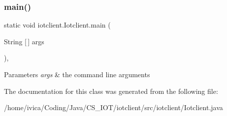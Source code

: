 \subsubsection{\texorpdfstring{main()}{main()}}
{\footnotesize\ttfamily static void iotclient.\+Iotclient.\+main (\begin{DoxyParamCaption}\item[{String \mbox{[}$\,$\mbox{]}}]{args }\end{DoxyParamCaption})\hspace{0.3cm}{\ttfamily [inline]}, {\ttfamily [static]}}


\begin{DoxyParams}{Parameters}
{\em args} & the command line arguments \\
\hline
\end{DoxyParams}


The documentation for this class was generated from the following file\+:\begin{DoxyCompactItemize}
\item 
/home/ivica/\+Coding/\+Java/\+C\+S\+\_\+\+I\+O\+T/iotclient/src/iotclient/Iotclient.\+java\end{DoxyCompactItemize}
